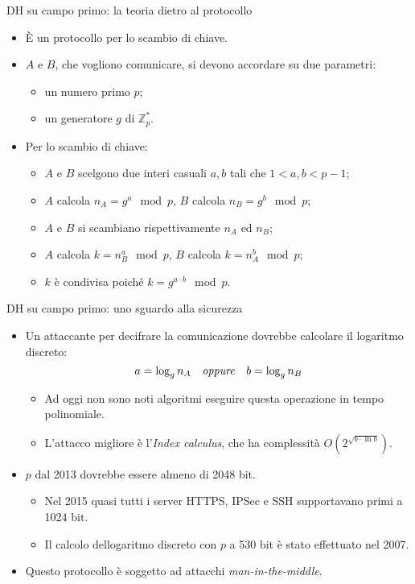 \documentclass[11pt,svgnames,smaller,aspectratio=169,italian]{beamer}
\begin{document}
\begin{frame}{DH su campo primo: la teoria dietro al protocollo}
	\begin{itemize}
		\item È un protocollo per lo scambio di chiave.
		\item $A$ e $B$, che vogliono comunicare, si devono accordare su due parametri:
			\begin{itemize}
				\item un numero primo $p$;
				\item un generatore $g$ di $\mathds{Z}_{p}^{*}$.
			\end{itemize}
		\item Per lo scambio di chiave:
			\begin{itemize}
				\item $A$ e $B$ scelgono due interi casuali $a, b$ tali che $1 < a, b < p - 1$;
				\item $A$ calcola $n_{A} = g^{a} \mod p$, $B$ calcola $n_{B} = g^{b} \mod p$;
				\item $A$ e $B$ si scambiano rispettivamente $n_{A}$ ed $n_{B}$;
				\item $A$ calcola $k = n_{B}^{a} \mod p$, $B$ calcola $k = n_{A}^{b} \mod p$;
				\item $k$ è condivisa poiché $k = g^{a \cdot b} \mod p$.
			\end{itemize}
	\end{itemize}
\end{frame}

\begin{frame}{DH su campo primo: uno sguardo alla sicurezza}
	\begin{itemize}
		\item Un attaccante per decifrare la comunicazione dovrebbe calcolare il logaritmo discreto:
			\begin{equation*}
				a = \log_{g} n_{A}	\quad\text{\emph{oppure}}	\quad b = \log_{g} n_{B}
			\end{equation*}
			\begin{itemize}
				\item Ad oggi non sono noti algoritmi eseguire questa operazione in tempo polinomiale.
				\item L'attacco migliore è l'\emph{Index calculus}, che ha complessità $O(2^{\sqrt{b \cdot \ln b}})$.
			\end{itemize}
		\item $p$ dal 2013 dovrebbe essere almeno di 2048 bit.
			\begin{itemize}
				\item Nel 2015 quasi tutti i server HTTPS, IPSec e SSH supportavano primi a 1024 bit.
				\item Il calcolo dellogaritmo discreto con $p$ a 530 bit è stato effettuato nel 2007.
			\end{itemize}
		\item Questo protocollo è soggetto ad attacchi \emph{man-in-the-middle}.
	\end{itemize}
\end{frame}
\end{document}
